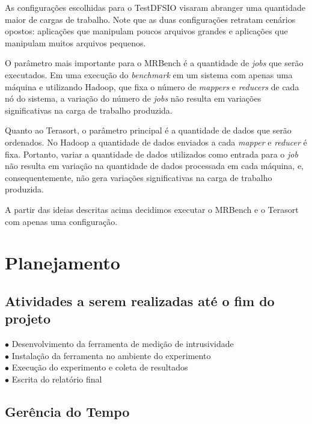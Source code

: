 \documentclass[a4paper,10pt]{article}
\begin{document}
As configurações escolhidas para o TestDFSIO visaram abranger uma quantidade
maior de cargas de trabalho. Note que as duas configurações retratam cenários
opostos: aplicações que manipulam poucos arquivos grandes e aplicações
que manipulam muitos arquivos pequenos.
 
O parâmetro mais importante para o MRBench é a quantidade de \textit{jobs} que
serão executados. Em uma execução do \textit{benchmark} em um sistema com apenas
uma máquina e utilizando Hadoop, que fixa o número de \textit{mappers} e
\textit{reducers} de cada nó do sistema, a variação do número de \textit{jobs}
não resulta em variações significativas na carga de trabalho produzida.

Quanto ao Terasort, o parâmetro principal é a quantidade de dados que serão
ordenados. No Hadoop a quantidade de dados enviados a cada \textit{mapper} e
\textit{reducer} é fixa. Portanto, variar a quantidade de dados utilizados como
entrada para o \textit{job} não resulta em variação na quantidade de dados
processada em cada máquina, e, consequentemente, não gera variações
significativas na carga de trabalho produzida.

A partir das ideias descritas acima decidimos executar o MRBench e o Terasort
com apenas uma configuração.

\section{Planejamento}

\subsection{\textbf{Atividades a serem realizadas até o fim do projeto}}

\begin{description}
  \item[$\bullet$ Desenvolvimento da ferramenta de medição de intrusividade] 
  \item[$\bullet$ Instalação da ferramenta no ambiente do experimento]
  \item[$\bullet$ Execução do experimento e coleta de resultados]
  \item[$\bullet$ Escrita do relatório final]
\end{description}

\subsection{\textbf{Gerência do Tempo}}
\end{document}
